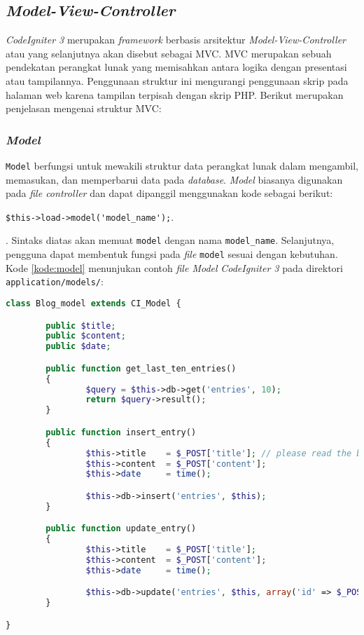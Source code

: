 \subsection{\textit{Model-View-Controller}}
\textit{CodeIgniter 3} merupakan \textit{framework} berbasis arsitektur \textit{Model-View-Controller} atau yang selanjutnya akan disebut sebagai MVC. MVC merupakan sebuah pendekatan perangkat lunak yang memisahkan antara logika dengan presentasi atau tampilannya. Penggunaan struktur ini mengurangi penggunaan skrip pada halaman web karena tampilan terpisah dengan skrip PHP. Berikut merupakan penjelasan mengenai struktur MVC:

\subsubsection{\textit{Model}} \texttt{Model} berfungsi untuk mewakili struktur data perangkat lunak dalam mengambil, memasukan, dan memperbarui data pada \textit{database}. \textit{Model} biasanya digunakan pada \textit{file controller} dan dapat dipanggil menggunakan kode sebagai berikut: 
\begin{center}
\verb|$this->load->model('model_name');|.
\end{center}. 
Sintaks diatas akan memuat \texttt{model} dengan nama \texttt{model\_name}. Selanjutnya, pengguna dapat membentuk fungsi pada \textit{file} \texttt{model} sesuai dengan kebutuhan. Kode \ref{kode:model} menunjukan contoh \textit{file Model} \textit{CodeIgniter 3} pada direktori \verb|application/models/|:

\begin{lstlisting}[language=PHP, caption=Contoh \textit{model} pada \textit{CodeIgniter 3}, label=kode:model]
class Blog_model extends CI_Model {

        public $title;
        public $content;
        public $date;

        public function get_last_ten_entries()
        {
                $query = $this->db->get('entries', 10);
                return $query->result();
        }

        public function insert_entry()
        {
                $this->title    = $_POST['title']; // please read the below note
                $this->content  = $_POST['content'];
                $this->date     = time();

                $this->db->insert('entries', $this);
        }

        public function update_entry()
        {
                $this->title    = $_POST['title'];
                $this->content  = $_POST['content'];
                $this->date     = time();

                $this->db->update('entries', $this, array('id' => $_POST['id']));
        }

}
\end{lstlisting}

